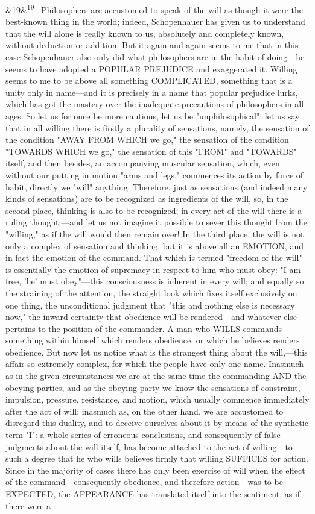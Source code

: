 \documentclass[12pt]{article}
\newcommand{\para}[1][]{\par\noindent\ifx&#1&\else\textsuperscript{\footnotesize #1}~\fi}
\begin{document}
\para[19] Philosophers are accustomed to speak of the will as though it were the best-known thing in the world; indeed, Schopenhauer has given us to understand that the will alone is really known to us, absolutely and completely known, without deduction or addition. But it again and again seems to me that in this case Schopenhauer also only did what philosophers are in the habit of doing---he seems to have adopted a POPULAR PREJUDICE and exaggerated it. Willing seems to me to be above all something COMPLICATED, something that is a unity only in name---and it is precisely in a name that popular prejudice lurks, which has got the mastery over the inadequate precautions of philosophers in all ages. So let us for once be more cautious, let us be "unphilosophical": let us say that in all willing there is firstly a plurality of sensations, namely, the sensation of the condition "AWAY FROM WHICH we go," the sensation of the condition "TOWARDS WHICH we go," the sensation of this "FROM" and "TOWARDS" itself, and then besides, an accompanying muscular sensation, which, even without our putting in motion "arms and legs," commences its action by force of habit, directly we "will" anything. Therefore, just as sensations (and indeed many kinds of sensations) are to be recognized as ingredients of the will, so, in the second place, thinking is also to be recognized; in every act of the will there is a ruling thought;---and let us not imagine it possible to sever this thought from the "willing," as if the will would then remain over! In the third place, the will is not only a complex of sensation and thinking, but it is above all an EMOTION, and in fact the emotion of the command. That which is termed "freedom of the will" is essentially the emotion of supremacy in respect to him who must obey: "I am free, 'he' must obey"---this consciousness is inherent in every will; and equally so the straining of the attention, the straight look which fixes itself exclusively on one thing, the unconditional judgment that "this and nothing else is necessary now," the inward certainty that obedience will be rendered---and whatever else pertains to the position of the commander. A man who WILLS commands something within himself which renders obedience, or which he believes renders obedience. But now let us notice what is the strangest thing about the will,---this affair so extremely complex, for which the people have only one name. Inasmuch as in the given circumstances we are at the same time the commanding AND the obeying parties, and as the obeying party we know the sensations of constraint, impulsion, pressure, resistance, and motion, which usually commence immediately after the act of will; inasmuch as, on the other hand, we are accustomed to disregard this duality, and to deceive ourselves about it by means of the synthetic term "I": a whole series of erroneous conclusions, and consequently of false judgments about the will itself, has become attached to the act of willing---to such a degree that he who wills believes firmly that willing SUFFICES for action. Since in the majority of cases there has only been exercise of will when the effect of the command---consequently obedience, and therefore action---was to be EXPECTED, the APPEARANCE has translated itself into the sentiment, as if there were a 
\end{document}
